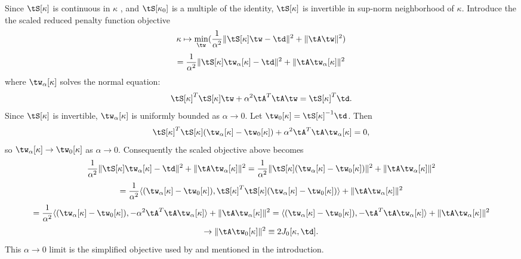 Since $\tS[\kappa]$ is continuous in $\kappa$
\cite[]{BlazekStolkSymes:13}, and $\tS[\kappa_0]$ is a multiple of the
identity, $\tS[\kappa]$ is invertible in sup-norm neighborhood of
$\kappa$. Introduce the the scaled reduced penalty function objective
\[
\kappa \mapsto \min_{\tw}(\frac{1}{\alpha^2}\|\tS[\kappa]\tw-\td\|^2 + \|\tA
\tw\|^2)
\]
\[
=\frac{1}{\alpha^2}\|\tS[\kappa]\tw_{\alpha}[\kappa]-\td\|^2 + \|\tA
\tw_{\alpha}[\kappa]\|^2
\]
where $\tw_{\alpha}[\kappa]$ solves the normal equation:
\[
\tS[\kappa]^T\tS[\kappa]\tw  + \alpha^2\tA^T\tA\tw = \tS[\kappa]^T\td.
\]
Since $\tS[\kappa]$ is invertible, $\tw_{\alpha}[\kappa]$ is uniformly
bounded as $\alpha \rightarrow 0$. Let $\tw_0[\kappa] =
\tS[\kappa]^{-1}\td$. Then
\[
\tS[\kappa]^T\tS[\kappa](\tw_{\alpha}[\kappa]-\tw_0[\kappa])+\alpha^2\tA^T\tA\tw_{\alpha}[\kappa]
= 0,
\]
so $\tw_{\alpha}[\kappa] \rightarrow \tw_0[\kappa]$ as $\alpha
\rightarrow 0$. Consequently the scaled objective above becomes
\[
\frac{1}{\alpha^2}\|\tS[\kappa]\tw_{\alpha}[\kappa]-\td\|^2 + \|\tA 
\tw_{\alpha}[\kappa]\|^2
=\frac{1}{\alpha^2}\|\tS[\kappa](\tw_{\alpha}[\kappa]-\tw_0[\kappa])\|^2 + \|\tA 
\tw_{\alpha}[\kappa]\|^2
\]
\[
=\frac{1}{\alpha^2}\langle (\tw_{\alpha}[\kappa]-\tw_0[\kappa]),
\tS[\kappa]^T\tS[\kappa](\tw_{\alpha}[\kappa]-\tw_0[\kappa])\rangle+ \|\tA 
\tw_{\alpha}[\kappa]\|^2
\]
\[
=\frac{1}{\alpha^2}\langle (\tw_{\alpha}[\kappa]-\tw_0[\kappa]),
-\alpha^2\tA^T\tA \tw_{\alpha}[\kappa] \rangle + \|\tA\tw_{\alpha}[\kappa]\|^2
=\langle (\tw_{\alpha}[\kappa]-\tw_0[\kappa]),
-\tA^T\tA \tw_{\alpha}[\kappa] \rangle + \|\tA\tw_{\alpha}[\kappa]\|^2
\]
\begin{equation}
\label{eqn:j0def}
\rightarrow \|\tA\tw_0[\kappa]\|^2 \equiv 2 J_0[\kappa,\td].
\end{equation}
This $\alpha \rightarrow 0$ limit is the simplified objective used by
\cite{Symes:EAGE15} and mentioned in the introduction.



